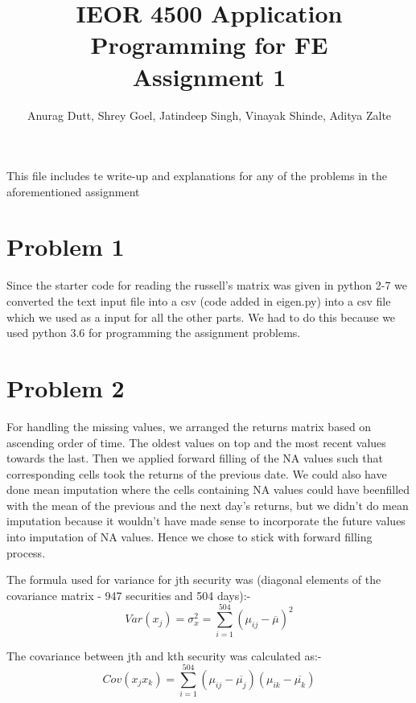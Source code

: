 \documentclass[twoside,11pt]{article}
\title{IEOR 4500 Application Programming for FE \\
  \large Assignment 1
} %
\author{Anurag Dutt, Shrey Goel, Jatindeep Singh, Vinayak Shinde, Aditya Zalte}    %
\let\oldsection\section
\renewcommand\section{\clearpage\oldsection}
\begin{document}
\maketitle
This file includes te write-up and explanations for any of the problems in the aforementioned assignment

\section*{Problem 1}
Since the starter code for reading the russell's matrix was given in python 2-7 we converted the text input file into a csv (code added in eigen.py) into a csv file which we used as a input for all the other parts. We had to do this because we used python 3.6 for programming the assignment problems. 

\section*{Problem 2}
For handling the missing values, we arranged the returns matrix	based on ascending order of time. The oldest values on top and the most	recent values towards the last.	Then we	applied	forward filling of the NA values such	that corresponding cells took the returns of the previous date.	We could also have done	mean imputation	where the cells	containing NA values could have	beenfilled with the mean of the previous and	the next day's returns,	but we didn't do mean imputation because it wouldn't have made sense to	incorporate the	future values into imputation of NA values. Hence we chose to stick with forward filling process.

The formula used for variance for jth security was (diagonal elements of the covariance matrix - 947 securities and 504 days):-
\begin{equation}
  Var(x_j) = \sigma_x^2 = \sum_{i = 1}^{504} (\mu_{ij}-\overline{\mu})^2
\end{equation}

The covariance between jth and kth security was calculated as:- \\
\begin{equation}
  Cov(x_jx_k) = \sum_{i = 1}^{504} (\mu_{ij}-\overline{\mu_j})(\mu_{ik}-\overline{\mu_k})
\end{equation}

\end{document}
